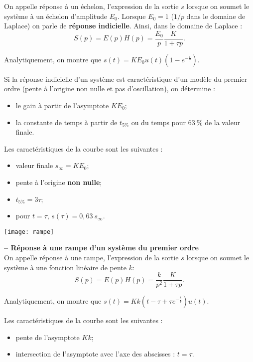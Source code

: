 \begin{resultat}

On appelle réponse à un échelon, l'expression de la sortie $s$ lorsque on soumet le système à un échelon d'amplitude $E_0$. Lorsque $E_0=1$ ($1/p$ dans le domaine de Laplace) on parle de \textbf{réponse indicielle}.
Ainsi, dans le domaine de Laplace :
$$
S(p)=E(p)H(p) = \dfrac{E_0}{p} \dfrac{K}{1+\tau p}.
$$ 

Analytiquement, on montre que $s(t)=K E_0 u(t) \left(1-e^{-\frac{t}{\tau}}\right)$. 

Si la réponse indicielle d'un système est caractéristique d'un modèle du premier ordre (pente à l'origine non nulle et pas d'oscillation), on détermine :
\begin{itemize}
\item le gain à partir de l'asymptote $K E_0$;
\item la constante de temps à partir de $t_{5\%}$ ou du temps pour $63~\%$ de la valeur finale.%
\end{itemize}
Les caractéristiques de la courbe sont les suivantes : 
\begin{itemize}
\item valeur finale $s_{\infty}=K E_0$;
\item pente à l'origine \textbf{non nulle};
\item $t_{5\%}=3\tau$;
\item pour $t=\tau$, $s(\tau)=0,63~ s_{\infty}$.
\end{itemize}
\end{resultat}




\begin{marginfigure}
\texttt{[image: rampe]}
\end{marginfigure}
\begin{resultat}\textbf{\textsf{\small -- Réponse à une rampe d'un système du premier ordre}}~\\

On appelle réponse à une rampe, l'expression de la sortie $s$ lorsque on soumet le système à une fonction linéaire de pente $k$: 
$$
S(p)=E(p)H(p) = \dfrac{k}{p^2} \dfrac{K}{1+\tau p}.
$$ 


Analytiquement, on montre que $s(t)=Kk \left(t-\tau+\tau e^{-\frac{t}{\tau}}\right)u(t)$. 

Les caractéristiques de la courbe sont les suivantes : 
\begin{itemize}
\item pente de l'asymptote $K k$;
\item intersection de l'asymptote avec l'axe des abscisses : $t=\tau$.
\end{itemize}
\end{resultat}


